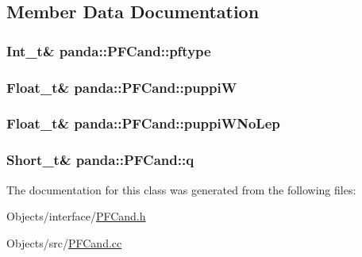 \subsection{Member Data Documentation}
\hypertarget{classpanda_1_1PFCand_a3a9d989992c79a41f3dc4585384b5b21}{
\subsubsection[{pftype}]{\setlength{\rightskip}{0pt plus 5cm}Int\_\-t\& {\bf panda::PFCand::pftype}}}
\label{classpanda_1_1PFCand_a3a9d989992c79a41f3dc4585384b5b21}
\hypertarget{classpanda_1_1PFCand_adb468a1207be96d664eb843e3eca83aa}{
\subsubsection[{puppiW}]{\setlength{\rightskip}{0pt plus 5cm}Float\_\-t\& {\bf panda::PFCand::puppiW}}}
\label{classpanda_1_1PFCand_adb468a1207be96d664eb843e3eca83aa}
\hypertarget{classpanda_1_1PFCand_a45d26010870903cbaa8f449fba20037d}{
\subsubsection[{puppiWNoLep}]{\setlength{\rightskip}{0pt plus 5cm}Float\_\-t\& {\bf panda::PFCand::puppiWNoLep}}}
\label{classpanda_1_1PFCand_a45d26010870903cbaa8f449fba20037d}
\hypertarget{classpanda_1_1PFCand_ab969e02d290c672ecaf2526e695acab0}{
\subsubsection[{q}]{\setlength{\rightskip}{0pt plus 5cm}Short\_\-t\& {\bf panda::PFCand::q}}}
\label{classpanda_1_1PFCand_ab969e02d290c672ecaf2526e695acab0}


The documentation for this class was generated from the following files:\begin{DoxyCompactItemize}
\item 
Objects/interface/\hyperlink{PFCand_8h}{PFCand.h}\item 
Objects/src/\hyperlink{PFCand_8cc}{PFCand.cc}\end{DoxyCompactItemize}
